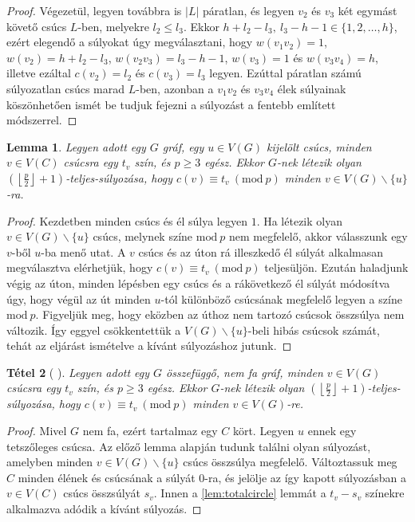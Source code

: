 \documentclass[12pt, a4paper]{report}
\newtheorem{tét}{Tétel}[section]
\newtheorem{lem}[tét]{Lemma}
\theoremstyle{remark}
\theoremstyle{definition}
\begin{document}
\begin{proof}
Végezetül, legyen továbbra is $|L|$ páratlan, és legyen $v_2$ és $v_3$ két egymást követő csúcs $L$-ben, melyekre $l_2 \leq l_3$. Ekkor $h + l_2 - l_3,\ l_3 - h - 1 \in \lbrace 1, 2, \ldots, h \rbrace$, ezért elegendő a súlyokat úgy megválasztani, hogy $w(v_1 v_2) = 1$, $w(v_2) = h + l_2 - l_3$, $w(v_2 v_3) = l_3 - h - 1$, $w(v_3) = 1$ és $w(v_3 v_4) = h$, illetve ezáltal $c(v_2) = l_2$ és $c(v_3) = l_3$ legyen. Ezúttal páratlan számú súlyozatlan csúcs marad $L$-ben, azonban a $v_1 v_2$ és $v_3 v_4$ élek súlyainak köszönhetően ismét be tudjuk fejezni a súlyozást a fentebb említett módszerrel.
\end{proof}

\begin{lem}
Legyen adott egy $G$ gráf, egy $u \in V(G)$ kijelölt csúcs, minden $v \in V(C)$ csúcsra egy $t_v$ szín, és $p \geq 3$ egész. Ekkor $G$-nek létezik olyan $\left( \left\lfloor \frac{p}{2} \right\rfloor + 1 \right)$-teljes-súlyozása, hogy $c(v) ≡ t_v\ (\mathrm{mod}\ p)$ minden $v \in V(G) \smallsetminus \lbrace u \rbrace$-ra.
\end{lem}

\begin{proof}
Kezdetben minden csúcs és él súlya legyen $1$. Ha létezik olyan $v \in V(G) \smallsetminus \lbrace u \rbrace$ csúcs, melynek színe $\mathrm{mod}\ p$ nem megfelelő, akkor válasszunk egy $v$-ből $u$-ba menő utat. A $v$ csúcs és az úton rá illeszkedő él súlyát alkalmasan megválasztva elérhetjük, hogy $c(v) ≡ t_v\ (\mathrm{mod}\ p)$ teljesüljön. Ezután haladjunk végig az úton, minden lépésben egy csúcs és a rákövetkező él súlyát módosítva úgy, hogy végül az út minden $u$-tól különböző csúcsának megfelelő legyen a színe $\mathrm{mod}\ p$. Figyeljük meg, hogy eközben az úthoz nem tartozó csúcsok összsúlya nem változik. Így eggyel csökkentettük a $V(G) \smallsetminus \lbrace u \rbrace$-beli hibás csúcsok számát, tehát az eljárást ismételve a kívánt súlyozáshoz jutunk.
\end{proof}

\begin{tét}[\citeauthor{Przybylo2010} \cite{Przybylo2010}]
Legyen adott egy $G$ összefüggő, nem fa gráf, minden $v \in V(G)$ csúcsra egy $t_v$ szín, és $p \geq 3$ egész. Ekkor $G$-nek létezik olyan $\left( \left\lfloor \frac{p}{2} \right\rfloor + 1 \right)$-teljes-súlyozása, hogy $c(v) ≡ t_v\ (\mathrm{mod}\ p)$ minden $v \in V(G)$-re.
\end{tét}

\begin{proof}
Mivel $G$ nem fa, ezért tartalmaz egy $C$ kört. Legyen $u$ ennek egy tetszőleges csúcsa. Az előző lemma alapján tudunk találni olyan súlyozást, amelyben minden $v \in V(G) \smallsetminus \lbrace u \rbrace$ csúcs összsúlya megfelelő. Változtassuk meg $C$ minden élének és csúcsának a súlyát $0$-ra, és jelölje az így kapott súlyozásban a $v \in V(C)$ csúcs összsúlyát $s_v$. Innen a \ref{lem:totalcircle} lemmát a $t_v - s_v$ színekre alkalmazva adódik a kívánt súlyozás.
\end{proof}
\end{document}
